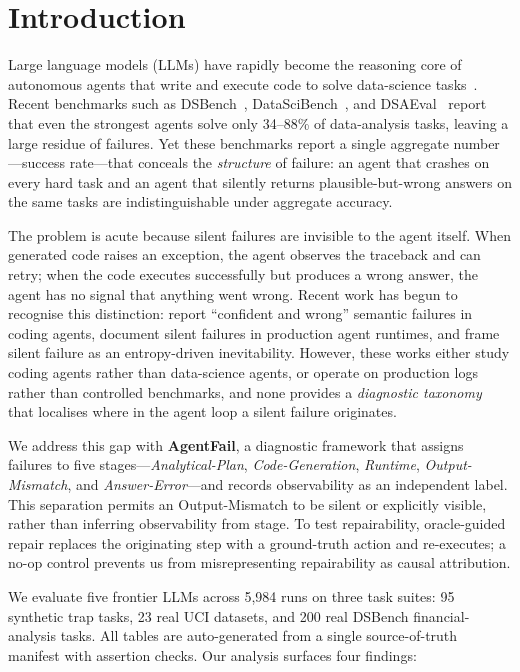 \section{Introduction}
\label{sec:intro}

Large language models (LLMs) have rapidly become the reasoning core of autonomous agents that write and execute code to solve data-science tasks~\citep{maojun2025survey,rahman2025llmbased}. Recent benchmarks such as DSBench~\citep{jing2024dsbench}, DataSciBench~\citep{zhang2026datascibench}, and DSAEval~\citep{sun2026dsaeval} report that even the strongest agents solve only 34--88\% of data-analysis tasks, leaving a large residue of failures. Yet these benchmarks report a single aggregate number---success rate---that conceals the \emph{structure} of failure: an agent that crashes on every hard task and an agent that silently returns plausible-but-wrong answers on the same tasks are indistinguishable under aggregate accuracy.

The problem is acute because silent failures are invisible to the agent itself. When generated code raises an exception, the agent observes the traceback and can retry; when the code executes successfully but produces a wrong answer, the agent has no signal that anything went wrong. Recent work has begun to recognise this distinction: \citet{mehta2026confident} report ``confident and wrong'' semantic failures in coding agents, \citet{wu2026when} document silent failures in production agent runtimes, and \citet{liu2026silent} frame silent failure as an entropy-driven inevitability. However, these works either study coding agents rather than data-science agents, or operate on production logs rather than controlled benchmarks, and none provides a \emph{diagnostic taxonomy} that localises where in the agent loop a silent failure originates.

We address this gap with \textbf{AgentFail}, a diagnostic framework that assigns failures to five stages---\emph{Analytical-Plan}, \emph{Code-Generation}, \emph{Runtime}, \emph{Output-Mismatch}, and \emph{Answer-Error}---and records observability as an independent label. This separation permits an Output-Mismatch to be silent or explicitly visible, rather than inferring observability from stage. To test repairability, oracle-guided repair replaces the originating step with a ground-truth action and re-executes; a no-op control prevents us from misrepresenting repairability as causal attribution.

We evaluate five frontier LLMs across 5{,}984 runs on three task suites: 95 synthetic trap tasks, 23 real UCI datasets, and 200 real DSBench financial-analysis tasks. All tables are auto-generated from a single source-of-truth manifest with assertion checks. Our analysis surfaces four findings:

